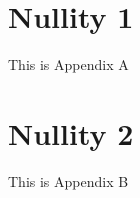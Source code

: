 

\begin{singlespace}

	{\small
		
		
	}
\end{singlespace}

\newpage
{}	%
\appendix
\chapter{Nullity 1}\label{appndxA}
This is Appendix A

\chapter{Nullity 2}\label{appndxB}
This is Appendix B
